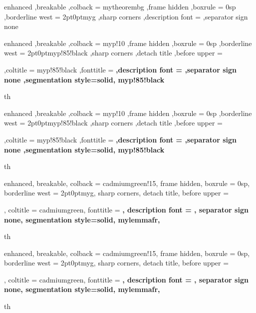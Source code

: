 {%
	enhanced
	,breakable
	,colback = mytheorembg
	,frame hidden
	,boxrule = 0sp
	,borderline west = {2pt}{0pt}{myg}
	,sharp corners
	,description font = \mdseries
	,separator sign none
}

{%
	enhanced
	,breakable
	,colback = myp!10
	,frame hidden
	,boxrule = 0sp
	,borderline west = {2pt}{0pt}{myp!85!black}
	,sharp corners
	,detach title
	,before upper = \tcbtitle\par\smallskip
	,coltitle = myp!85!black
	,fonttitle = \bfseries\sffamily
	,description font = \mdseries
	,separator sign none
	,segmentation style={solid, myp!85!black}
}
{th}
{%
	enhanced
	,breakable
	,colback = myp!10
	,frame hidden
	,boxrule = 0sp
	,borderline west = {2pt}{0pt}{myp!85!black}
	,sharp corners
	,detach title
	,before upper = \tcbtitle\par\smallskip
	,coltitle = myp!85!black
	,fonttitle = \bfseries\sffamily
	,description font = \mdseries
	,separator sign none
	,segmentation style={solid, myp!85!black}
}
{th}



{%
	enhanced,
	breakable,
	colback = cadmiumgreen!15,
	frame hidden,
	boxrule = 0sp,
	borderline west = {2pt}{0pt}{myg},
	sharp corners,
	detach title,
	before upper = \tcbtitle\par\smallskip,
	coltitle = cadmiumgreen,
	fonttitle = \bfseries\sffamily,
	description font = \mdseries,
	separator sign none,
	segmentation style={solid, mylemmafr},
}
{th}

{%
	enhanced,
	breakable,
	colback = cadmiumgreen!15,
	frame hidden,
	boxrule = 0sp,
	borderline west = {2pt}{0pt}{myg},
	sharp corners,
	detach title,
	before upper = \tcbtitle\par\smallskip,
	coltitle = cadmiumgreen,
	fonttitle = \bfseries\sffamily,
	description font = \mdseries,
	separator sign none,
	segmentation style={solid, mylemmafr},
}
{th}


